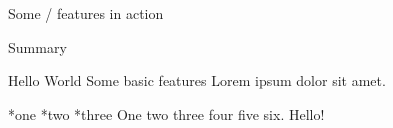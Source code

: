 \fontfam[LM fonts]
\typosize[11/13]

\tit Some \OpTeX/ features in action


\nonum\notoc\sec Summary

\maketoc

\chap Hello World
    \sec Some basic features
Lorem ipsum dolor sit amet.

\begitems
*one
*two
*three
\enditems
One two three four five six. Hello!

\bye

